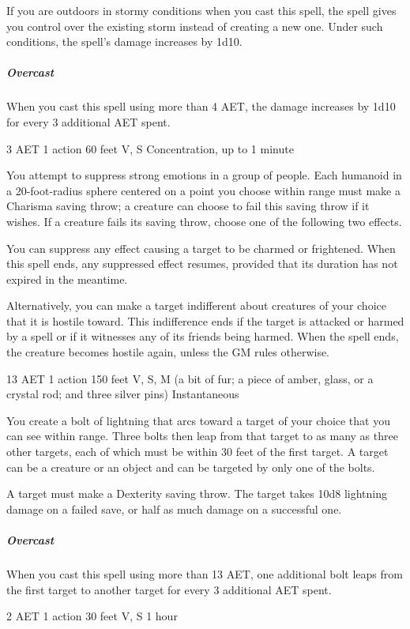 If you are outdoors in stormy conditions when you cast this spell, the spell gives you control over the existing storm instead of creating a new one. Under such conditions, the spell's damage increases by 1d10.

\subparagraph*{Overcast} When you cast this spell using more than 4 AET, the damage increases by 1d10 for every 3 additional AET spent.


{3 AET}
{1 action}
{60 feet}
{V, S}
{Concentration, up to 1 minute}

You attempt to suppress strong emotions in a group of people. Each humanoid in a 20-foot-radius sphere centered on a point you choose within range must make a Charisma saving throw; a creature can choose to fail this saving throw if it wishes. If a creature fails its saving throw, choose one of the following two effects.

You can suppress any effect causing a target to be charmed or frightened. When this spell ends, any suppressed effect resumes, provided that its duration has not expired in the meantime.

Alternatively, you can make a target indifferent about creatures of your choice that it is hostile toward. This indifference ends if the target is attacked or harmed by a spell or if it witnesses any of its friends being harmed. When the spell ends, the creature becomes hostile again, unless the GM rules otherwise.

{13 AET}
{1 action}
{150 feet}
{V, S, M (a bit of fur; a piece of amber, glass, or a crystal rod; and three silver pins)}
{Instantaneous}

You create a bolt of lightning that arcs toward a target of your choice that you can see within range. Three bolts then leap from that target to as many as three other targets, each of which must be within 30 feet of the first target. A target can be a creature or an object and can be targeted by only one of the bolts.

A target must make a Dexterity saving throw. The target takes 10d8 lightning damage on a failed save, or half as much damage on a successful one.

\subparagraph*{Overcast} When you cast this spell using more than 13 AET, one additional bolt leaps from the first target to another target for every 3 additional AET spent.


{2 AET}
{1 action}
{30 feet}
{V, S}
{1 hour}

